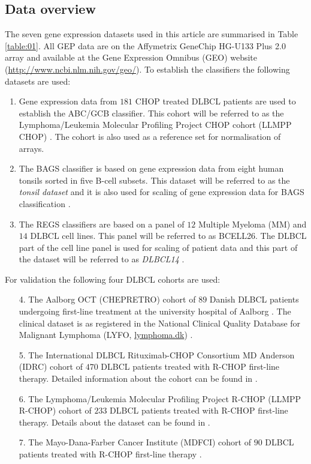 \documentclass{article}
\begin{document}
\subsection{Data overview}
The seven gene expression datasets used in this article are summarised in Table \ref{table:01}.
All GEP data are on the Affymetrix GeneChip HG-U133 Plus 2.0 array and available at the Gene Expression Omnibus (GEO) \citep{Barrett2013} website (\url{http://www.ncbi.nlm.nih.gov/geo/}).
To establish the classifiers the following datasets are used:
\begin{enumerate}
  \item Gene expression data from $181$ CHOP treated DLBCL patients are used to establish the ABC/GCB classifier.
  This cohort will be referred to as the Lymphoma/Leukemia Molecular Profiling Project CHOP cohort (LLMPP CHOP) \citep{Lenz2008a}.
  The cohort is also used as a reference set for normalisation of arrays.
  \item The BAGS classifier is based on gene expression data from eight human tonsils sorted in five B-cell subsets.
  This dataset will be referred to as the \textit{tonsil dataset} and it is also used for scaling of gene expression data for BAGS classification \citep{DybkaerBoegsted2015}.
  \item The REGS classifiers are based on a panel of $12$ Multiple Myeloma (MM) and $14$ DLBCL cell lines.
  This panel will be referred to as BCELL26.
  The DLBCL part of the cell line panel is used for scaling of patient data and this part of the dataset will be referred to as \textit{DLBCL14} \citep{Falgreen2015}.
\end{enumerate}
For validation the following four DLBCL cohorts are used:
\begin{enumerate}
  \item[4.] The Aalborg OCT (CHEPRETRO) cohort of $89$ Danish DLBCL patients undergoing first-line treatment at the university  hospital of Aalborg \citep{DybkaerBoegsted2015}.
  The clinical dataset is as registered in the National Clinical Quality Database for Malignant Lymphoma (LYFO, \url{lymphoma.dk}) \citep{Gang2012}.
  \item[5.] The International DLBCL Rituximab-CHOP Consortium MD Anderson (IDRC) cohort of $470$ DLBCL patients treated with R-CHOP first-line therapy.
  Detailed information about the cohort can be found in \citep{Visco2012}.
  \item[6.] The Lymphoma/Leukemia Molecular Profiling Project R-CHOP (LLMPP R-CHOP) cohort of $233$ DLBCL patients treated with R-CHOP first-line therapy.
  Details about the dataset can be found in \citep{Lenz2008a}.
  \item[7.] The Mayo-Dana-Farber Cancer Institute (MDFCI) cohort of $90$ DLBCL patients treated with R-CHOP first-line therapy \citep{Monti2012a}.
\end{enumerate}
\end{document}
